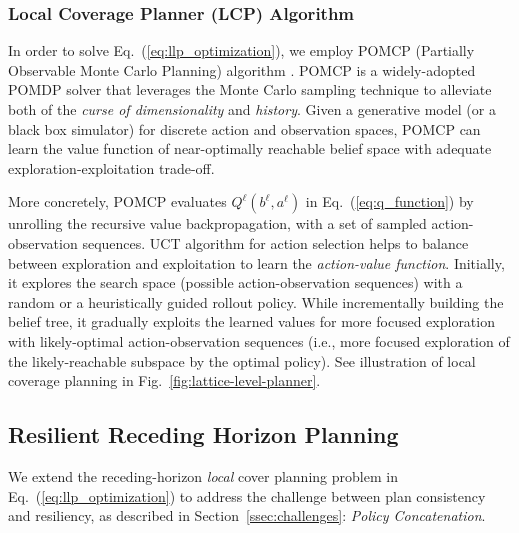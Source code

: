 \documentclass[letterpaper]{article} %
\newcommand{\phdone}[1]{} %
\begin{document}
\subsubsection{Local Coverage Planner (LCP) Algorithm} \hfill

\noindent
In order to solve Eq.~(\ref{eq:llp_optimization}), we employ POMCP (Partially Observable Monte Carlo Planning) algorithm \cite{silver2010monte}.
POMCP is a widely-adopted POMDP solver that leverages the Monte Carlo sampling technique to alleviate both of the \textit{curse of dimensionality} and \textit{history}.
Given a generative model (or a black box simulator) for discrete action and observation spaces, POMCP can learn the value function of near-optimally reachable belief space with adequate exploration-exploitation trade-off.


\phdone{POMCP Details}
More concretely, POMCP evaluates $Q^\ell(b^\ell, a^\ell)$ in Eq.~(\ref{eq:q_function}) by unrolling the recursive value backpropagation, with a set of sampled action-observation sequences.
UCT algorithm for action selection helps to balance between exploration and exploitation to learn the \textit{action-value function}.
Initially, it explores the search space (possible action-observation sequences) with a random or a heuristically guided rollout policy.
While incrementally building the belief tree, it gradually exploits the learned values for more focused exploration with likely-optimal action-observation sequences (i.e., more focused exploration of the likely-reachable subspace by the optimal policy).
See illustration of local coverage planning in Fig.~\ref{fig:lattice-level-planner}.




\subsection{Resilient Receding Horizon Planning} \label{ssec:resilient_rhp}

\phdone{Consistency and Resiliency}
We extend the receding-horizon \textit{local} cover planning problem
in Eq.~(\ref{eq:llp_optimization}) to address the challenge between plan consistency and resiliency, as described in Section~\ref{ssec:challenges}:
\textit{Policy Concatenation}.

\end{document}
